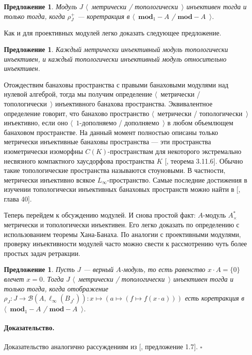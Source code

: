 \documentclass[12pt]{article}
\newtheorem{proposition}[theorem]{Предложение}
\renewenvironment{proof}{\paragraph{Доказательство.}}{\hfill$\square$\medskip}
\begin{document}
\begin{proposition}\label{MetTopInjModViaCanonicMorph} Модуль $J$
    $\langle$~метрически / топологически~$\rangle$ инъективен тогда и только
    тогда, когда $\rho_J^+$ --- коретракция в $\langle$~$\mathbf{mod}_1-A$ /
    $\mathbf{mod}-A$~$\rangle$.
\end{proposition}

Как и для проективных модулей легко доказать следующее предложение.

\begin{proposition}\label{MetInjIsTopInjAndTopInjIsRelInj} Каждый метрически
    инъективный модуль топологически инъективен, и каждый топологически
    инъективный модуль относительно инъективен.
\end{proposition}

Отождествим банаховы пространства с правыми банаховыми модулями над нулевой
алгеброй, тогда мы получим определение $\langle$~метрически /
топологически~$\rangle$ инъективного банахова пространства. Эквивалентное
определение говорит, что банахово пространство $\langle$~метрически /
топологически~$\rangle$ инъективно, если оно $\langle$~$1$-дополняемо /
дополняемо~$\rangle$ в любом объемлющем банаховом пространстве. На данный момент
полностью описаны только метрически инъективные банаховы пространства --- эти
пространства изометрически изоморфны $C(K)$-пространствам для некоторого
экстремально несвязного компактного хаусдорфова пространства $K$
[\cite{LaceyIsomThOfClassicBanSp}, теорема 3.11.6]. Обычно такие топологические
пространства называются стоуновыми. В частности, метрически инъективно всякое
$L_\infty$-пространство. Самые последние достижения в изучении топологически
инъективных банаховых пространств можно найти в
[\cite{JohnLinHandbookGeomBanSp}, глава 40].

Теперь перейдем к обсуждению модулей. И снова простой факт: $A$-модуль
$A_\times^*$ метрически и топологически инъективен. Его легко доказать по
определению с использованием теоремы Хана-Банаха. По аналогии с проективными
модулями, проверку инъективности модулей часто можно свести к рассмотрению чуть
более простых задач ретракции.

\begin{proposition}\label{NonDegenMetTopInjCharac}  Пусть $J$ --- верный
    $A$-модуль, то есть равенство $x\cdot A= \{0 \}$ влечет $x=0$. Тогда $J$
    $\langle$~метрически / топологически~$\rangle$ инъективен тогда и только
    тогда, когда отображение
    $\rho_J:J\to\mathcal{B}(A,\ell_\infty(B_{J^*})):x\mapsto(a\mapsto(f\mapsto
        f(x\cdot a)))$ есть коретракция в $\langle$~$\mathbf{mod}_1-A$ /
    $\mathbf{mod}-A$~$\rangle$.
\end{proposition}
\begin{proof} Доказательство аналогично рассуждениям из
    [\cite{DalPolHomolPropGrAlg}, предложение 1.7].
\end{proof}
\end{document}
